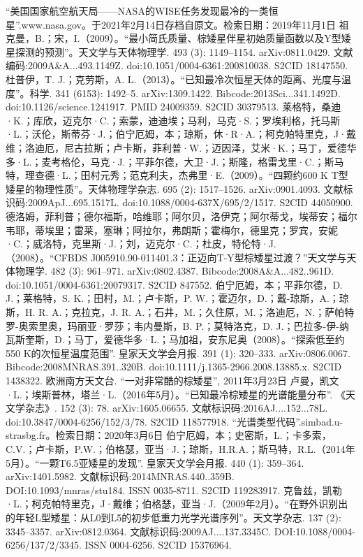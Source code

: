 \begin{enumerate}
 “美国国家航空航天局——NASA的WISE任务发现最冷的一类恒星”.www.nasa.gov。于2021年2月14日存档自原文。检索日期：2019年11月1日
 祖克曼，B.；宋，I.（2009）。“最小简氏质量、棕矮星伴星初始质量函数以及Y型矮星探测的预测”。天文学与天体物理学. 493 (3): 1149–1154. arXiv:0811.0429. 文献编码:2009A&A...493.1149Z. doi:10.1051/0004-6361:200810038. S2CID 18147550.
 杜普伊，T. J.；克劳斯，A. L.（2013）。“已知最冷次恒星天体的距离、光度与温度”。科学. 341 (6153): 1492–5. arXiv:1309.1422. Bibcode:2013Sci...341.1492D. doi:10.1126/science.1241917. PMID 24009359. S2CID 30379513.
 莱格特，桑迪·K.；库欣，迈克尔·C.；索蒙，迪迪埃；马利，马克·S.；罗埃利格，托马斯·L.；沃伦，斯蒂芬·J.；伯宁厄姆，本；琼斯，休·R·A.；柯克帕特里克，J·戴维；洛迪厄，尼古拉斯；卢卡斯，菲利普·W.；迈因泽，艾米·K.；马丁，爱德华多·L.；麦考格伦，马克·J.；平菲尔德，大卫·J.；斯隆，格雷戈里·C.；斯马特，理查德·L.；田村元秀；范克利夫，杰弗里·E.（2009）。“四颗约600 K T型矮星的物理性质”。天体物理学杂志. 695 (2): 1517–1526. arXiv:0901.4093. 文献标识码:2009ApJ...695.1517L. doi:10.1088/0004-637X/695/2/1517. S2CID 44050900.
 德洛姆，菲利普；德尔福斯，哈维耶；阿尔贝，洛伊克；阿尔蒂戈，埃蒂安；福尔韦耶，蒂埃里；雷莱，塞琳；阿拉尔，弗朗斯；霍梅尔，德里克；罗宾，安妮·C.；威洛特，克里斯·J.；刘，迈克尔·C.；杜皮，特伦特·J.（2008）。“CFBDS J005910.90-011401.3：正迈向T-Y型棕矮星过渡？”天文学与天体物理学. 482 (3): 961–971. arXiv:0802.4387. Bibcode:2008A&A...482..961D. doi:10.1051/0004-6361:20079317. S2CID 847552.
 伯宁厄姆，本；平菲尔德，D. J.；莱格特，S. K.；田村，M.；卢卡斯，P. W.；霍迈尔，D.；戴-琼斯，A.；琼斯，H. R. A.；克拉克，J. R. A.；石井，M.；久住原，M.；洛迪厄，N.；萨帕特罗-奥索里奥，玛丽亚·罗莎；韦内曼斯，B. P.；莫特洛克，D. J.；巴拉多-伊-纳瓦斯奎斯，D.；马丁，爱德华多·L.；马加祖，安东尼奥（2008）。“探索低至约550 K的次恒星温度范围”. 皇家天文学会月报. 391 (1): 320–333. arXiv:0806.0067. Bibcode:2008MNRAS.391..320B. doi:10.1111/j.1365-2966.2008.13885.x. S2CID 1438322.
 欧洲南方天文台. “一对非常酷的棕矮星”, 2011年3月23日
 卢曼，凯文·L.；埃斯普林，塔兰·L.（2016年5月）。“已知最冷棕矮星的光谱能量分布”. 《天文学杂志》. 152 (3): 78. arXiv:1605.06655. 文献标识码:2016AJ....152...78L. doi:10.3847/0004-6256/152/3/78. S2CID 118577918.
 “光谱类型代码”.simbad.u-strasbg.fr。检索日期：2020年3月6日
 伯宁厄姆，本；史密斯，L.；卡多索，C.V.；卢卡斯，P.W.；伯格瑟，亚当·J.；琼斯，H.R.A.；斯马特，R.L.（2014年5月）。“一颗T6.5亚矮星的发现”. 皇家天文学会月报. 440 (1): 359–364. arXiv:1401.5982. 文献标识码:2014MNRAS.440..359B. DOI:10.1093/mnras/stu184. ISSN 0035-8711. S2CID 119283917.
 克鲁兹，凯勒·L.；柯克帕特里克，J·戴维；伯格瑟，亚当·J.（2009年2月）。“在野外识别出的年轻L型矮星：从L0到L5的初步低重力光学光谱序列”。天文学杂志. 137 (2): 3345–3357. arXiv:0812.0364. 文献标识码:2009AJ....137.3345C. DOI:10.1088/0004-6256/137/2/3345. ISSN 0004-6256. S2CID 15376964.

\end{enumerate}

